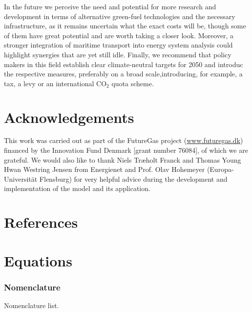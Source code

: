 \documentclass[article]{elsarticle}
\begin{document}
In the future we perceive the need and potential for more research and development in terms of alternative green-fuel technologies and the necessary infrastructure, as it remains uncertain what the exact costs will be, though some of them have great potential and are worth taking a closer look. Moreover, a stronger integration of maritime transport into energy system analysis could highlight synergies that are yet still idle. Finally, we recommend that policy makers in this field establish clear climate-neutral targets for 2050 and introduc the respective measures, preferably on a broad scale,introducing, for example, a tax, a levy or an international CO$_2$ quota scheme.


\section*{Acknowledgements}
This work was carried out as part of the FutureGas project (\url{www.futuregas.dk}) financed by the Innovation Fund Denmark [grant number 76084], of which we are grateful. We would also like to thank Niels Tr\ae holt Franck and Thomas Young Hwan Westring Jensen from Energienet and Prof. Olav Hohemeyer (Europa-Universit\"at Flensburg) for very helpful advice during the development and implementation of the model and its application.

\section*{References}


\newpage
\appendix
\section{Equations}\label{app:equations}
\subsubsection{Nomenclature}\label{box:nomenclature}
\glsdisablehyper
\glsaddall
\begin{table}[h]
\begin{mdframed}
\footnotesize{
\begin{multicols}{2}
\printglossary[style=tree,type=a]
\vspace{-0.3cm}
\printglossary[style=tree,type=s]
\vspace{-0.3cm}
\printglossary[style=tree,type=v]
\vspace{-0.3cm}
\printglossary[style=tree,type=p]
\end{multicols}
}
\end{mdframed}
\caption*{Nomenclature list.}
\end{table}
\end{document}
